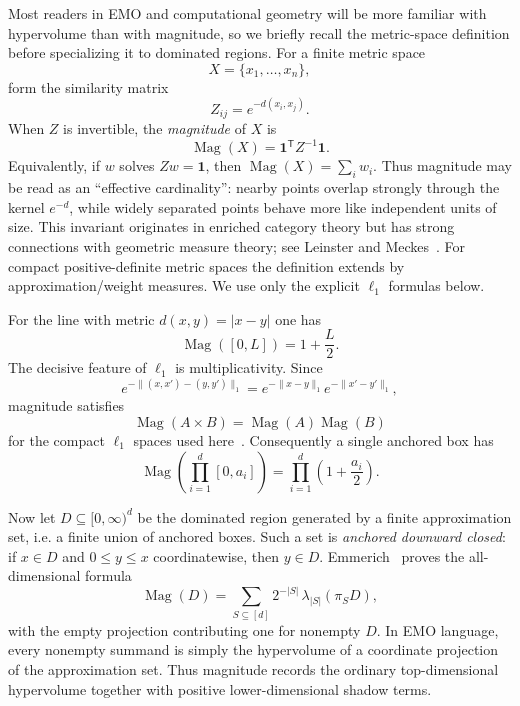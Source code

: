 \documentclass[12pt,a4paper]{article}
\theoremstyle{definition}
\newcommand{\Mag}{\operatorname{Mag}}
\newcommand{\1}{\mathbf 1}
\begin{document}
Most readers in EMO and computational geometry will be more familiar with hypervolume than with magnitude, so we briefly recall the metric-space definition before specializing it to dominated regions. For a finite metric space
\[
X=\{x_1,\ldots,x_n\},
\]
form the similarity matrix
\[
Z_{ij}=e^{-d(x_i,x_j)}.
\]
When $Z$ is invertible, the \emph{magnitude} of $X$ is
\begin{equation}
\Mag(X)=\mathbf 1^{\mathsf T}Z^{-1}\mathbf 1.                 \label{eq:finitemag}
\end{equation}
Equivalently, if $w$ solves $Zw=\mathbf 1$, then $\Mag(X)=\sum_i w_i$. Thus magnitude may be read as an ``effective cardinality'': nearby points overlap strongly through the kernel $e^{-d}$, while widely separated points behave more like independent units of size. This invariant originates in enriched category theory but has strong connections with geometric measure theory; see Leinster and Meckes~\cite{LeinsterMeckes2017}. For compact positive-definite metric spaces the definition extends by approximation/weight measures. We use only the explicit $\ell_1$ formulas below.

For the line with metric $d(x,y)=|x-y|$ one has
\begin{equation}
\Mag([0,L])=1+\frac L2.                                      \label{eq:intervalmag}
\end{equation}
The decisive feature of $\ell_1$ is multiplicativity. Since
\[
e^{-\|(x,x')-(y,y')\|_1}=e^{-\|x-y\|_1}e^{-\|x'-y'\|_1},
\]
magnitude satisfies
\begin{equation}
\Mag(A\times B)=\Mag(A)\Mag(B)                              \label{eq:productmag}
\end{equation}
for the compact $\ell_1$ spaces used here~\cite{LeinsterMeckes2017}. Consequently a single anchored box has
\begin{equation}
\Mag\!\left(\prod_{i=1}^d[0,a_i]\right)
   =\prod_{i=1}^d\left(1+\frac{a_i}{2}\right).              \label{eq:boxmag}
\end{equation}

Now let $D\subseteq[0,\infty)^d$ be the dominated region generated by a finite approximation set, i.e. a finite union of anchored boxes. Such a set is \emph{anchored downward closed}: if $x\in D$ and $0\le y\le x$ coordinatewise, then $y\in D$. Emmerich~\cite{Emmerich2026} proves the all-dimensional formula
\begin{equation}
\boxed{\Mag(D)=\sum_{S\subseteq[d]}2^{-|S|}\,\lambda_{|S|}(\pi_S D),}   \label{eq:projection}
\end{equation}
with the empty projection contributing one for nonempty $D$. In EMO language, every nonempty summand is simply the hypervolume of a coordinate projection of the approximation set. Thus magnitude records the ordinary top-dimensional hypervolume together with positive lower-dimensional shadow terms.
\end{document}
